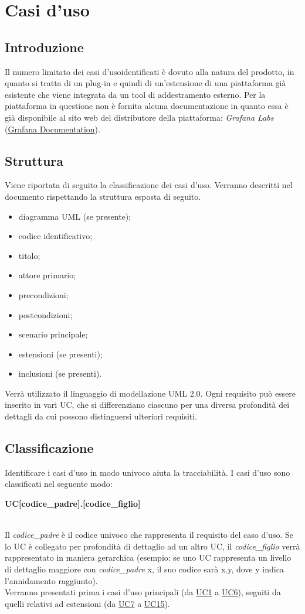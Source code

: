 \section{Casi d'uso}

	\subsection{Introduzione}
Il numero limitato dei casi d'uso\glo identificati è dovuto alla natura del prodotto, in quanto si tratta di un plug-in e quindi di un'estensione di una piattaforma già esistente che viene integrata da un tool di addestramento esterno.
Per la piattaforma in questione non è fornita alcuna documentazione in quanto essa è già disponibile al sito web del distributore della piattaforma: \emph{Grafana Labs} (\href{https://grafana.com/docs/grafana/latest/}{Grafana Documentation}).

	\subsection{Struttura}
Viene riportata di seguito la classificazione dei casi d'uso. Verranno descritti nel documento rispettando la struttura esposta di seguito.
		\begin{itemize}
			\item diagramma UML (se presente);
			\item codice identificativo;
			\item titolo;
			\item attore primario;
			\item precondizioni;
			\item postcondizioni;
			\item scenario principale;
			\item estensioni (se presenti);
			\item inclusioni (se presenti).
		\end{itemize}
Verrà utilizzato il linguaggio di modellazione UML 2.0\glo.
Ogni requisito può essere inserito in vari UC\glo, che si differenziano ciascuno per una diversa profondità dei dettagli da cui possono distinguersi ulteriori requisiti.

\subsection{Classificazione}
Identificare i casi d'uso in modo univoco aiuta la tracciabilità. I casi d'uso sono classificati nel seguente modo: \\
\centerline{\textbf{UC[codice\_padre].[codice\_figlio]}} \\
Il \textit{codice\_padre} è il codice univoco che rappresenta il requisito del caso d'uso. Se lo UC è collegato per profondità di dettaglio ad un altro UC, il \textit{codice\_figlio} verrà rappresentato in maniera gerarchica (esempio: se uno UC rappresenta un livello di dettaglio maggiore con \textit{codice\_padre} x, il suo codice sarà x.y, dove y indica l'annidamento raggiunto). \\ Verranno presentati prima i casi d'uso principali (da \hyperref[par:UC1]{UC1} a \hyperref[par:UC6]{UC6}), seguiti da quelli relativi ad estensioni (da \hyperref[par:UC7]{UC7} a \hyperref[par:UC15]{UC15}).

